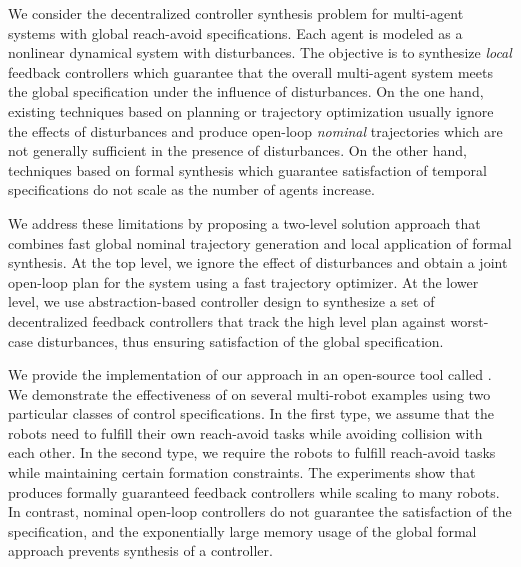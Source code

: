 
We consider the decentralized controller synthesis problem for multi-agent systems with global reach-avoid specifications.
Each agent is modeled as a nonlinear dynamical system with disturbances. The objective is to synthesize \emph{local} feedback controllers which guarantee that the overall multi-agent system meets the global specification under the influence of disturbances.
%
On the one hand, existing techniques based on planning or trajectory optimization usually ignore the effects of disturbances and produce open-loop
\emph{nominal} trajectories which are not generally sufficient in the presence of disturbances.
On the other hand, techniques based on formal synthesis which guarantee satisfaction of temporal specifications do not scale as the number of agents increase.

We address these limitations by proposing a two-level solution approach that combines fast global nominal trajectory generation and local application of formal synthesis.
At the top level, we ignore the effect of disturbances and obtain a joint open-loop plan for the system using a fast trajectory optimizer.
At the lower level, we use abstraction-based controller design to synthesize a set of decentralized feedback controllers 
that track the high level plan against worst-case disturbances, thus ensuring satisfaction of the global specification.

We provide the implementation of our approach in an open-source tool called \tool.
We demonstrate the effectiveness of \tool on several multi-robot examples using two particular classes of control specifications.
In the first type, we assume that the robots need to fulfill their own reach-avoid tasks while avoiding collision with each other.
In the second type, we require the robots to fulfill reach-avoid tasks while maintaining certain formation constraints.
The experiments show that \tool produces formally guaranteed feedback controllers while scaling to many robots.
In contrast, nominal open-loop controllers do not guarantee the satisfaction of the specification, and the exponentially large memory usage of the global formal approach prevents synthesis of a controller.
